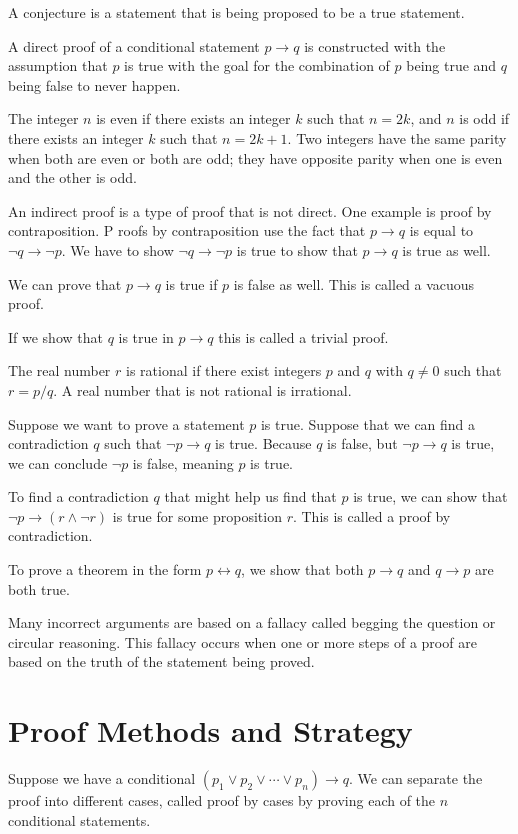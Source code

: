\documentclass[../discrete.tex]{subfiles}
\begin{document}
A conjecture is a statement that is being proposed to be a true statement.

A direct proof of a conditional statement $p\rightarrow q$ is constructed with the 
assumption that $p$ is true with the goal for the combination of $p$ being true and $q$ being false to never happen. 
\begin{definition}
    The integer $n$ is even if there exists an integer $k$ such that $n=2k$, and $n$ is odd if there exists an 
    integer $k$ such that $n=2k+1$. Two integers have the same parity when both are even or both are odd; they have 
    opposite parity when one is even and the other is odd.
\end{definition}

An indirect proof is a type of proof that is not direct. One example is proof by contraposition. P
roofs by contraposition use the fact that $p\rightarrow q$ is equal to $\neg q \rightarrow \neg p$. 
We have to show $\neg q \rightarrow \neg p$ is true to show that $p\rightarrow q$ is true as well.

We can prove that $p\rightarrow q$ is true if $p$ is false as well. This is called a vacuous proof. 

If we show that $q$ is true in $p\rightarrow q$ this is called a trivial proof. 
\begin{definition}
    The real number $r$ is rational if there exist integers $p$ and $q$ with $q\neq 0$ such that $r=p/q$. 
    A real number that is not rational is irrational.
\end{definition}

Suppose we want to prove a statement $p$ is true. Suppose that we can find a contradiction $q$ such that 
$\neg p \rightarrow q$ is true. Because $q$ is false, but $\neg p \rightarrow q$ is true, we can conclude 
$\neg p$ is false, meaning $p$ is true. 

To find a contradiction $q$ that might help us find that $p$ is true, we can show that 
$\neg p \rightarrow (r\land \neg r)$ is true for some proposition $r$. This is called a proof by contradiction. 

To prove a theorem in the form $p\leftrightarrow q$, we show that both $p\rightarrow q$ and $q\rightarrow p$ are both true. 

Many incorrect arguments are based on a fallacy called begging the question or circular reasoning. 
This fallacy occurs when one or more steps of a proof are based on the truth of the statement being proved.

\section{Proof Methods and Strategy}
Suppose we have a conditional $(p_1\lor p_2\lor \cdots \lor p_n)\rightarrow q$. We can separate the 
proof into different cases, called proof by cases by proving each of the $n$ conditional statements.
\end{document}

